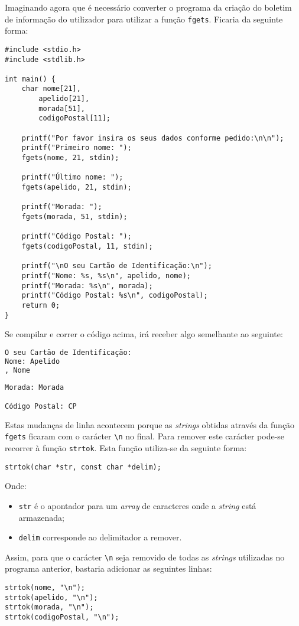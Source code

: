 Imaginando agora que é necessário converter o programa da criação do boletim de informação do utilizador para utilizar a função \texttt{fgets}. Ficaria da seguinte forma:

\begin{lstlisting}
#include <stdio.h>
#include <stdlib.h>
 
int main() {
    char nome[21],
        apelido[21],
        morada[51],
        codigoPostal[11];
 
    printf("Por favor insira os seus dados conforme pedido:\n\n");
    printf("Primeiro nome: ");
    fgets(nome, 21, stdin);
 
    printf("Último nome: ");
    fgets(apelido, 21, stdin);
 
    printf("Morada: ");
    fgets(morada, 51, stdin);
 
    printf("Código Postal: ");
    fgets(codigoPostal, 11, stdin);
 
    printf("\nO seu Cartão de Identificação:\n");
    printf("Nome: %s, %s\n", apelido, nome);
    printf("Morada: %s\n", morada);
    printf("Código Postal: %s\n", codigoPostal);
    return 0;
}
\end{lstlisting}

Se compilar e correr o código acima, irá receber algo semelhante ao seguinte:

\begin{lstlisting}[language=bash,numbers=none]
O seu Cartão de Identificação:
Nome: Apelido
, Nome
 
Morada: Morada

Código Postal: CP
\end{lstlisting}

Estas mudanças de linha acontecem porque as \textit{strings} obtidas através da função \texttt{fgets} ficaram com o carácter \texttt{\textbackslash n} no final. Para remover este carácter pode-se recorrer à função \texttt{strtok}. Esta função utiliza-se da seguinte forma:

\begin{lstlisting}
strtok(char *str, const char *delim);
\end{lstlisting}

Onde:

\begin{itemize}
\item \texttt{str} é o apontador para um \textit{array} de caracteres onde a \textit{string} está armazenada;
\item \texttt{delim} corresponde ao delimitador a remover.
\end{itemize}

Assim, para que o carácter \texttt{\textbackslash n} seja removido de todas as \textit{strings} utilizadas no programa anterior, bastaria adicionar as seguintes linhas:

\begin{lstlisting}
strtok(nome, "\n");
strtok(apelido, "\n");
strtok(morada, "\n");
strtok(codigoPostal, "\n");
\end{lstlisting}